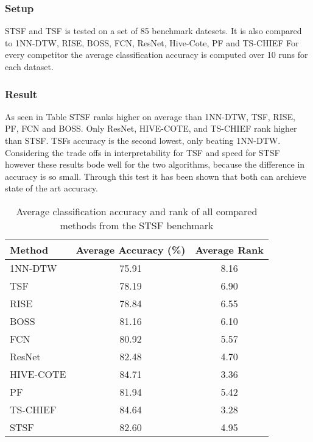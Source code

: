 \subsubsection*{Setup}
STSF and TSF is tested on a set of 85 benchmark datesets. %
It is also compared to 1NN-DTW, RISE, BOSS, FCN, ResNet, Hive-Cote, PF and TS-CHIEF %
For every competitor the average classification accuracy is computed over 10 runs for each dataset.

\subsubsection*{Result}
As seen in Table  STSF ranks higher on average than 1NN-DTW, TSF, RISE, PF, FCN and BOSS.
Only ResNet, HIVE-COTE, and TS-CHIEF rank higher than STSF. 
TSFs accuracy is the second lowest, only beating 1NN-DTW. 
Considering the trade offs in interpretability for TSF and speed for STSF however these results bode well for the two algorithms, because the 
difference in accuracy is so small. Through this test it has been shown that both can archieve state of the 
art accuracy.
\begin{table}[h]
\centering
\caption{Average classification accuracy and rank of all compared methods from the STSF benchmark}
\label{tab:stsf_full_results}
\begin{tabular}{lcc}
\toprule
\textbf{Method} & \textbf{Average Accuracy (\%)} & \textbf{Average Rank} \\
\midrule
1NN-DTW     & 75.91 & 8.16 \\
TSF         & 78.19 & 6.90 \\
RISE        & 78.84 & 6.55 \\
BOSS        & 81.16 & 6.10 \\
FCN         & 80.92 & 5.57 \\
ResNet      & 82.48 & 4.70 \\
HIVE-COTE   & 84.71 & 3.36 \\
PF          & 81.94 & 5.42 \\
TS-CHIEF    & 84.64 & 3.28 \\
STSF        & 82.60 & 4.95 \\
\bottomrule
\end{tabular}
\end{table}

